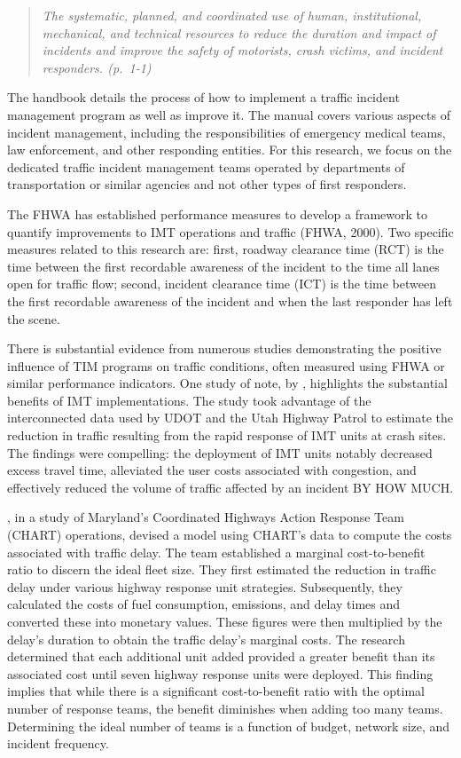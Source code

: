 \documentclass[
  letterpaper,
  authoryear]{elsarticle}
\begin{document}
\begin{quote}
\emph{The systematic, planned, and coordinated use of human,
institutional, mechanical, and technical resources to reduce the
duration and impact of incidents and improve the safety of motorists,
crash victims, and incident responders. (p.~1-1)}
\end{quote}

The handbook details the process of how to implement a traffic incident
management program as well as improve it. The manual covers various
aspects of incident management, including the responsibilities of
emergency medical teams, law enforcement, and other responding entities.
For this research, we focus on the dedicated traffic incident management
teams operated by departments of transportation or similar agencies and
not other types of first responders.

The FHWA has established performance measures to develop a framework to
quantify improvements to IMT operations and traffic (FHWA, 2000). Two
specific measures related to this research are: first, roadway clearance
time (RCT) is the time between the first recordable awareness of the
incident to the time all lanes open for traffic flow; second, incident
clearance time (ICT) is the time between the first recordable awareness
of the incident and when the last responder has left the scene.

There is substantial evidence from numerous studies demonstrating the
positive influence of TIM programs on traffic conditions, often measured
using FHWA or similar performance indicators. One study of note, by
\citep{schultz2019}, highlights the substantial benefits of IMT
implementations. The study took advantage of the interconnected data
used by UDOT and the Utah Highway Patrol to estimate the reduction in
traffic resulting from the rapid response of IMT units at crash sites.
The findings were compelling: the deployment of IMT units notably
decreased excess travel time, alleviated the user costs associated with
congestion, and effectively reduced the volume of traffic affected by an
incident BY HOW MUCH.

\citet{kim2012}, in a study of Maryland's Coordinated Highways Action
Response Team (CHART) operations, devised a model using CHART's data to
compute the costs associated with traffic delay. The team established a
marginal cost-to-benefit ratio to discern the ideal fleet size. They
first estimated the reduction in traffic delay under various highway
response unit strategies. Subsequently, they calculated the costs of
fuel consumption, emissions, and delay times and converted these into
monetary values. These figures were then multiplied by the delay's
duration to obtain the traffic delay's marginal costs. The research
determined that each additional unit added provided a greater benefit
than its associated cost until seven highway response units were
deployed. This finding implies that while there is a significant
cost-to-benefit ratio with the optimal number of response teams, the
benefit diminishes when adding too many teams. Determining the ideal
number of teams is a function of budget, network size, and incident
frequency.
\end{document}
